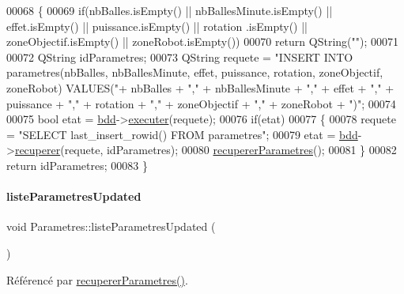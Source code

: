 \begin{DoxyCode}
00068 \{
00069     \textcolor{keywordflow}{if}(nbBalles.isEmpty() || nbBallesMinute.isEmpty() || effet.isEmpty() || puissance.isEmpty() || rotation
      .isEmpty() || zoneObjectif.isEmpty() || zoneRobot.isEmpty())
00070         \textcolor{keywordflow}{return} QString(\textcolor{stringliteral}{""});
00071 
00072     QString idParametres;
00073     QString requete = \textcolor{stringliteral}{"INSERT INTO parametres(nbBalles, nbBallesMinute, effet, puissance, rotation,
       zoneObjectif, zoneRobot) VALUES("}+ nbBalles + \textcolor{stringliteral}{","} + nbBallesMinute + \textcolor{stringliteral}{","} + effet + \textcolor{stringliteral}{","} + puissance + \textcolor{stringliteral}{","} + rotation
       + \textcolor{stringliteral}{","} + zoneObjectif + \textcolor{stringliteral}{","} + zoneRobot + \textcolor{stringliteral}{")"};
00074 
00075     \textcolor{keywordtype}{bool} etat = \hyperlink{class_parametres_a1e21034f7e758d93974e0dc070d47dee}{bdd}->\hyperlink{class_base_de_donnees_aa8de5f8f8bb17edc43f5c0ee33712081}{executer}(requete);
00076     \textcolor{keywordflow}{if}(etat)
00077     \{
00078         requete = \textcolor{stringliteral}{"SELECT last\_insert\_rowid() FROM parametres"};
00079         etat = \hyperlink{class_parametres_a1e21034f7e758d93974e0dc070d47dee}{bdd}->\hyperlink{class_base_de_donnees_a77539baad389f5acf754cd2cd452403e}{recuperer}(requete, idParametres);
00080         \hyperlink{class_parametres_a853872796d32655f3f1ffc090b6d076a}{recupererParametres}();
00081     \}
00082     \textcolor{keywordflow}{return} idParametres;
00083 \}
\end{DoxyCode}
\mbox{\label{class_parametres_aa6649347b6e61f767dc14346f2ea858e}} 
\paragraph{\texorpdfstring{liste\+Parametres\+Updated}{listeParametresUpdated}}
{\footnotesize\ttfamily void Parametres\+::liste\+Parametres\+Updated (\begin{DoxyParamCaption}{ }\end{DoxyParamCaption})\hspace{0.3cm}{\ttfamily [signal]}}



Référencé par \hyperlink{class_parametres_a853872796d32655f3f1ffc090b6d076a}{recuperer\+Parametres()}.

